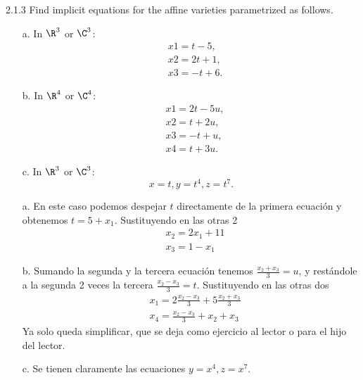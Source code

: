 \documentclass[twoside]{article}
\begin{document}
\newpage

\begin{ejercicio}{2.1.3}
Find implicit equations for the affine varieties parametrized as follows.
\begin{itemize}
\item[a.] In $\R^3$ or $\C^3$:
\begin{align*}
&x1 = t − 5,\\
&x2 = 2t + 1,\\
&x3 = −t + 6.
\end{align*}
\item[b.] In $\R^4$ or $\C^4$:
\begin{align*}
&x1 = 2t − 5u,\\
&x2 = t + 2u,\\
&x3 = −t + u,\\
&x4 = t + 3u.
\end{align*}
\item[c.] In $\R^3$ or $\C^3$:
\[
x = t, y = t^4, z = t^7.
\]
\end{itemize}
\end{ejercicio}
\begin{solucion}
\begin{itemize}
\item[a.] En este caso podemos despejar $t$ directamente de la primera ecuación y obtenemos $t=5+x_1$. Sustituyendo en las otras 2
\begin{align*}
&x_2=2x_1+11\\
&x_3=1-x_1
\end{align*} 
\item[b.] Sumando la segunda y la tercera ecuación tenemos $\frac{x_2+x_3}{3}=u$, y restándole a la segunda 2 veces la tercera $\frac{x_2-x_3}{3}=t$. Sustituyendo en las otras dos
\begin{align*}
&x_1=2\frac{x_2-x_3}{3}+5\frac{x_2+x_3}{3}\\
&x_4=\frac{x_2-x_3}{3}+x_2+x_3
\end{align*}
Ya solo queda simplificar, que se deja como ejercicio al lector o para el hijo del lector. 
\item[c.] Se tienen claramente las ecuaciones $y=x^4, z=x^7$. 
\end{itemize}
\end{solucion}

\newpage
\end{document}
